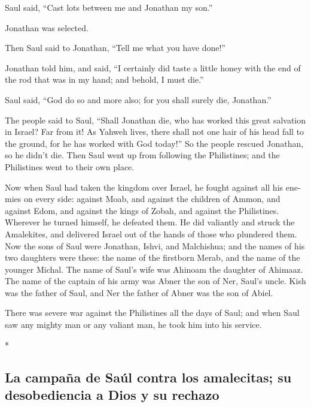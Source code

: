 \begin{paracol}{2}
\begin{otherlanguage}{english}
 Saul said, ``Cast lots between me and Jonathan my son.''

Jonathan was selected.

 Then Saul said to Jonathan, ``Tell me what you have
done!''

Jonathan told him, and said, ``I certainly did taste a little honey with
the end of the rod that was in my hand; and behold, I must die.''

 Saul said, ``God do so and more also; for you shall
surely die, Jonathan.''

 The people said to Saul, ``Shall Jonathan die, who has
worked this great salvation in Israel? Far from it! As Yahweh lives,
there shall not one hair of his head fall to the ground, for he has
worked with God today!'' So the people rescued Jonathan, so he didn't
die.  Then Saul went up from following the Philistines;
and the Philistines went to their own place.

 Now when Saul had taken the kingdom over Israel, he
fought against all his enemies on every side: against Moab, and against
the children of Ammon, and against Edom, and against the kings of Zobah,
and against the Philistines. Wherever he turned himself, he defeated
them.  He did valiantly and struck the Amalekites, and
delivered Israel out of the hands of those who plundered them.
 Now the sons of Saul were Jonathan, Ishvi, and
Malchishua; and the names of his two daughters were these: the name of
the firstborn Merab, and the name of the younger Michal. 
The name of Saul's wife was Ahinoam the daughter of Ahimaaz. The name of
the captain of his army was Abner the son of Ner, Saul's uncle.
 Kish was the father of Saul, and Ner the father of Abner
was the son of Abiel.

 There was severe war against the Philistines all the
days of Saul; and when Saul saw any mighty man or any valiant man, he
took him into his service.

\end{otherlanguage}

\switchcolumn[0]*

\hypertarget{la-campauxf1a-de-sauxfal-contra-los-amalecitas-su-desobediencia-a-dios-y-su-rechazo}{%
\subsection{La campaña de Saúl contra los amalecitas; su desobediencia a
Dios y su
rechazo}\label{la-campauxf1a-de-sauxfal-contra-los-amalecitas-su-desobediencia-a-dios-y-su-rechazo}}


\end{paracol}
